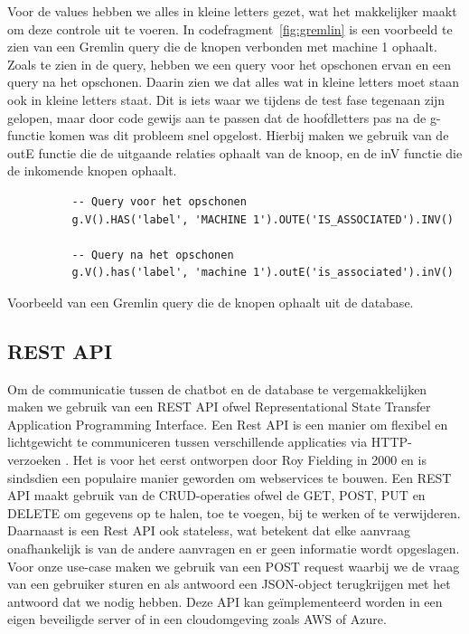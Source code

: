 Voor de values hebben we alles in kleine letters gezet, wat het makkelijker maakt om deze controle uit te voeren.
In codefragment~\ref{fig:gremlin} is een voorbeeld te zien van een Gremlin query die de knopen verbonden met machine 1 ophaalt.
Zoals te zien in de query, hebben we een query voor het opschonen ervan en een query na het opschonen. Daarin zien we dat alles wat in kleine letters moet staan ook in kleine letters staat.
Dit is iets waar we tijdens de test fase tegenaan zijn gelopen, maar door code gewijs aan te passen dat de hoofdletters pas na de g-functie komen was dit probleem snel opgelost.
Hierbij maken we gebruik van de outE functie die de uitgaande relaties ophaalt van de knoop, en de inV functie die de inkomende knopen ophaalt.

\begin{listing}
     \begin{verbatim}
          -- Query voor het opschonen
          g.V().HAS('label', 'MACHINE 1').OUTE('IS_ASSOCIATED').INV()

          -- Query na het opschonen
          g.V().has('label', 'machine 1').outE('is_associated').inV()
     \end{verbatim}
     \caption[Voorbeeld Gremlin query]{\label{fig:gremlin}Voorbeeld van een Gremlin query die de knopen ophaalt uit de database.}
\end{listing}

\subsection{REST API}
Om de communicatie tussen de chatbot en de database te vergemakkelijken maken we gebruik van een REST API ofwel Representational State Transfer Application Programming Interface.
Een Rest API is een manier om flexibel en lichtgewicht te communiceren tussen verschillende applicaties via HTTP-verzoeken \autocite{RESTAPI2021}.
Het is voor het eerst ontworpen door Roy Fielding in 2000 en is sindsdien een populaire manier geworden om webservices te bouwen.
Een REST API maakt gebruik van de CRUD-operaties ofwel de GET, POST, PUT en DELETE om gegevens op te halen, toe te voegen, bij te werken of te verwijderen.
Daarnaast is een Rest API ook stateless, wat betekent dat elke aanvraag onafhankelijk is van de andere aanvragen en er geen informatie wordt opgeslagen.
Voor onze use-case maken we gebruik van een POST request waarbij we de vraag van een gebruiker sturen en als antwoord een JSON-object terugkrijgen met het antwoord dat we nodig hebben. 
Deze API kan geïmplementeerd worden in een eigen beveiligde server of in een cloudomgeving zoals AWS of Azure.


